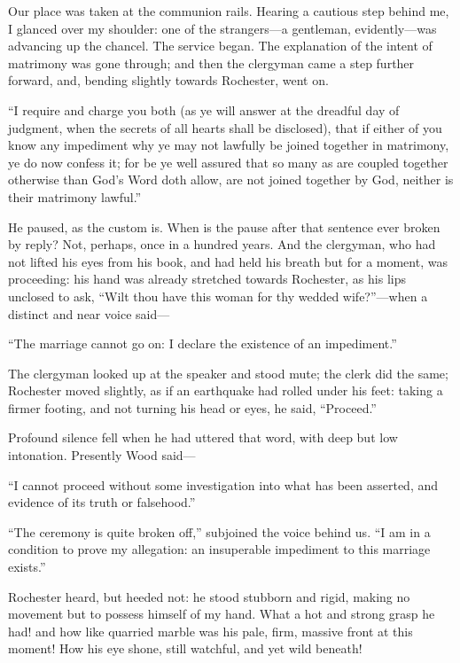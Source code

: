 Our place was taken at the communion rails. Hearing a cautious step
behind me, I glanced over my shoulder: one of the strangers---a
gentleman, evidently---was advancing up the chancel. The service
began. The explanation of the intent of matrimony was gone through; and
then the clergyman came a step further forward, and, bending slightly
towards \Mr{} Rochester, went on.

\enquote{I require and charge you both (as ye will answer at the
dreadful day of judgment, when the secrets of all hearts shall be
disclosed), that if either of you know any impediment why ye may not
lawfully be joined together in matrimony, ye do now confess it; for be
ye well assured that so many as are coupled together otherwise than
God's Word doth allow, are not joined together by God, neither is their
matrimony lawful.}

He paused, as the custom is. When is the pause after that sentence ever
broken by reply? Not, perhaps, once in a hundred years. And the
clergyman, who had not lifted his eyes from his book, and had held his
breath but for a moment, was proceeding: his hand was already stretched
towards \Mr{} Rochester, as his lips unclosed to ask, \enquote{Wilt thou
have this woman for thy wedded wife?}---when a distinct and near voice
said---

\enquote{The marriage cannot go on: I declare the existence of an
impediment.}

The clergyman looked up at the speaker and stood mute; the clerk did the
same; \Mr{} Rochester moved slightly, as if an earthquake had rolled under
his feet: taking a firmer footing, and not turning his head or eyes, he
said, \enquote{Proceed.}

Profound silence fell when he had uttered that word, with deep but low
intonation. Presently \Mr{} Wood said---

\enquote{I cannot proceed without some investigation into what has been
asserted, and evidence of its truth or falsehood.}

\enquote{The ceremony is quite broken off,} subjoined the voice behind
us. \enquote{I am in a condition to prove my allegation: an insuperable
impediment to this marriage exists.}

\Mr{} Rochester heard, but heeded not: he stood stubborn and rigid, making
no movement but to possess himself of my hand. What a hot and strong
grasp he had! and how like quarried marble was his pale, firm, massive
front at this moment! How his eye shone, still watchful, and yet wild
beneath!

